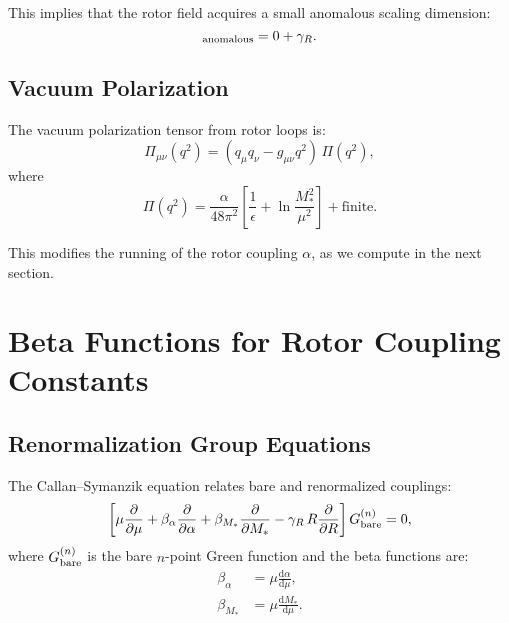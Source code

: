 \documentclass[11pt,a4paper]{article}
\numberwithin{equation}{section}
\theoremstyle{plain}
\theoremstyle{definition}
\theoremstyle{remark}
\newcommand{\dd}{\mathrm{d}}
\newcommand{\Rfield}{R(x)}                  %
\begin{document}
This implies that the rotor field acquires a small anomalous scaling dimension:
\begin{equation}
[\Rfield]_{\rm anomalous} = 0 + \gamma_R.
\label{eq:dim-anomalous}
\end{equation}

\subsection{Vacuum Polarization}

The vacuum polarization tensor from rotor loops is:
\begin{equation}
\Pi_{\mu\nu}(q^2) = (q_\mu q_\nu - g_{\mu\nu}q^2)\,\Pi(q^2),
\label{eq:vacuum-pol}
\end{equation}
where
\begin{equation}
\Pi(q^2) = \frac{\alpha}{48\pi^2}\left[\frac{1}{\epsilon} + \ln\frac{M_*^2}{\mu^2}\right] + \text{finite}.
\label{eq:Pi}
\end{equation}

This modifies the running of the rotor coupling $\alpha$, as we compute in the next section.

\vspace{1em}

\section{Beta Functions for Rotor Coupling Constants}\label{sec:beta}

\subsection{Renormalization Group Equations}

The Callan--Symanzik equation relates bare and renormalized couplings:
\begin{equation}
\left[\mu\frac{\partial}{\partial\mu} + \beta_\alpha\frac{\partial}{\partial\alpha} + \beta_{M_*}\frac{\partial}{\partial M_*} - \gamma_R\,R\frac{\partial}{\partial R}\right]G_{\rm bare}^{(n)} = 0,
\label{eq:CS-eqn}
\end{equation}
where $G_{\rm bare}^{(n)}$ is the bare $n$-point Green function and the beta functions are:
\begin{align}
\beta_\alpha &= \mu\frac{\dd\alpha}{\dd\mu}, \label{eq:beta-alpha-def}\\
\beta_{M_*} &= \mu\frac{\dd M_*}{\dd\mu}. \label{eq:beta-M-def}
\end{align}
\end{document}
